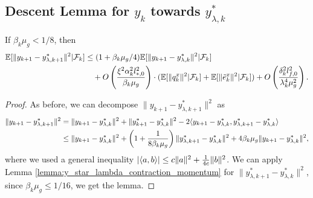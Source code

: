\subsection{Descent Lemma for $y_k$ towards $y_{\lambda,k}^*$}
\begin{lemma}
    \label{lemma:y_descent_1}
    If $\beta_k \mu_g < 1/8$, then
    \begin{align*}
        \mathbb{E}[\|y_{k+1} - y_{\lambda, k+1}^*\|^2 | \mathcal{F}_k] &\le (1 + \beta_k \mu_g / 4) \mathbb{E}[\|y_{k+1} - y_{\lambda,k}^*\|^2 | \mathcal{F}_k] \\
        &\quad + O\left( \frac{\xi^2 \alpha_k^2 l_{*,0}^2}{\beta_k \mu_g} \right) \cdot (\mathbb{E}[\|q_k^x\|^2 | \mathcal{F}_k] + \mathbb{E}[\|\tilde{e}_k^x\|^2 | \mathcal{F}_k]) + O\left(\frac{\delta_k^2 l_{f,0}^2}{\lambda_k^4 \mu_g^2} \right). 
    \end{align*}
\end{lemma}
\begin{proof}
    As before, we can decompose $\|y_{k+1} - y_{\lambda, k+1}^*\|^2$ as
    \begin{align*}
        \|y_{k+1} - y_{\lambda,k+1}^*\|^2 &= \|y_{k+1} - y_{\lambda,k}^*\|^2 + \|y_{k+1}^* - y_{\lambda,k}^*\|^2 - 2\langle y_{k+1}-y_{\lambda,k}^*, y_{\lambda,k+1}^* - y_{\lambda,k}^* \rangle \\
        &\le \|y_{k+1} - y_{\lambda,k}^*\|^2 + \left(1 + \frac{1}{8\beta_k \mu_g} \right) \|y_{\lambda,k+1}^* - y_{\lambda,k}^*\|^2 + 4\beta_k \mu_g \|y_{k+1}-y_{\lambda,k}^*\|^2,
    \end{align*}
    where we used a general inequality $|\langle a, b \rangle| \le c\|a\|^2 + \frac{1}{4c} \|b\|^2$.
    We can apply Lemma \ref{lemma:y_star_lambda_contraction_momentum} for $\|y_{\lambda,k+1}^* - y_{\lambda,k}^*\|^2$, 
    since $\beta_k \mu_g \le 1/16$, we get the lemma.
\end{proof}



